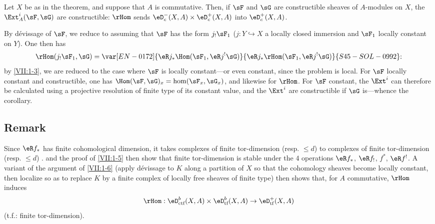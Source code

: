 \begin{corollary_}\label{VII:1-6}
Let $X$ be as in the theorem, and suppose that $A$ is commutative. Then, if
$\sF$ and $\sG$ are constructible sheaves of $A$-modules on $X$, the
$\Ext_A^i(\sF,\sG)$ are constructible: $\rHom$ sends
$\eD_c^-(X,A)\times \eD_c^+(X,A)$ into $\eD_c^+(X,A)$.
\end{corollary_}

By dévissage of $\sF$, we reduce to assuming that $\sF$ has the form
$j_!\sF_1$ ($j:Y\hookrightarrow X$ a locally closed immersion and $\sF_1$
locally constant on $Y$). One then has
\[
  \rHom(j_! \sF_1,\sG) = \var[EN-0172]{\eR j_\ast \Hom(\sF_1,\eR j^! \sG)}{\eR j_\ast \rHom(\sF_1,\eR j^! \sG)}{S45-SOL-0992} \text{:}
\]
by \ref{VII:1-3}, we are reduced to the case where $\sF$ is locally
constant---or even constant, since the problem is local. For $\sF$ locally
constant and constructible, one has
$\Hom(\sF,\sG)_x=\hom(\sF_x,\sG_x)$, and likewise for $\rHom$. For $\sF$
constant, the $\Ext^i$ can therefore be calculated using a projective
resolution of finite type of its constant value, and the $\Ext^i$ are
constructible if $\sG$ is---whence the corollary.






\subsection{Remark}\label{VII:1-7}

Since $\eR f_\ast$ has finite cohomological dimension, it takes complexes of
finite tor-dimension (resp. $\leqslant d$) to complexes of finite
tor-dimension (resp. $\leqslant d$) .
 and the proof of \ref{VII:1-5} then show that finite
tor-dimension is stable under the $4$ operations $\eR f_\ast$,
$\eR f_!$, $f^\ast$, $\eR f^!$. A variant of the argument of
\ref{VII:1-6} (apply dévissage to $K$ along a partition of $X$ so that the
cohomology sheaves become locally constant, then localize so as to replace $K$
by a finite complex of locally free sheaves of finite type) then shows that,
for $A$ commutative, $\rHom$ induces
\[
  \rHom:\eD_\text{ctf}^b(X,A)\times \eD_\text{tf}^b(X,A) \to \eD_\text{tf}^+(X,A)
\]
(t.f.: finite tor-dimension).






\subsection{}\label{VII:1-8}


